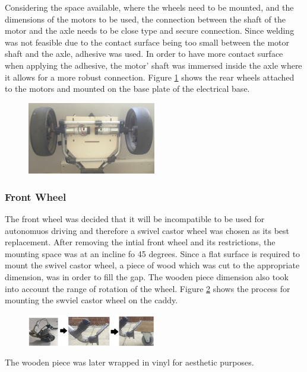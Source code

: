 \documentclass[11pt,landscape]{article}
\begin{document}
\begin{multicols}{2}
    Considering the space available, where the wheels need to be mounted, and
    the dimensions of the motors to be used, the connection between the shaft of
    the motor and the axle needs to be close type and secure connection. Since
    welding was not feasible due to the contact surface being too small between
    the motor shaft and the axle, adhesive was used. In order to have more
    contact surface when applying the adhesive, the motor’ shaft was immersed
    inside the axle where it allows for a more robust connection. Figure
    \ref{fig:auto} shows the rear wheels attached to the motors and mounted on
    the base plate of the electrical base.
    
    \begin{figure}[H]
        \begin{center}
            \includegraphics[width=0.5\textwidth]{Figure27.jpg}
            \label{fig:auto}
        \end{center}
    \end{figure}
    
    
    \subsubsection{Front Wheel}
    The front wheel was decided that it will be incompatible to be used for
    autonomuos driving and therefore a swivel castor wheel was chosen as its
    best replacement. After removing the intial front wheel and its
    restrictions, the mounting space was at an incline fo 45 degrees. Since a
    flat surface is required to mount the swivel castor wheel, a piece of wood
    which was cut to the appropriate dimension, was in order to fill the gap.
    The wooden piece dimension also took into account the range of rotation of
    the wheel. Figure \ref{fig:castor} shows the process for mounting the swviel
    castor wheel on the caddy. 
    
    \begin{figure}[H]
        \begin{center}
            \includegraphics[width=0.5\textwidth]{Figure28.jpg}
            \label{fig:castor}
        \end{center}
    \end{figure}
    The wooden piece was later wrapped in vinyl for aesthetic purposes.
    

\end{multicols}
\end{document}
